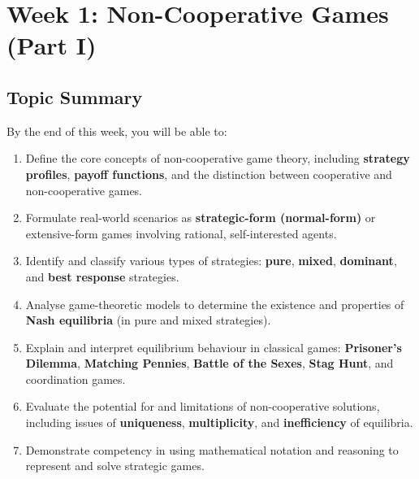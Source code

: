 \section{Week 1: Non-Cooperative Games (Part I)}

\subsection{Topic Summary}

\begin{keybox}
By the end of this week, you will be able to:
\begin{enumerate}
  \item Define the core concepts of non-cooperative game theory, including \textbf{strategy profiles}, \textbf{payoff functions}, and the distinction between cooperative and non-cooperative games.
  \item Formulate real-world scenarios as \textbf{strategic-form (normal-form)} or extensive-form games involving rational, self-interested agents.
  \item Identify and classify various types of strategies: \textbf{pure}, \textbf{mixed}, \textbf{dominant}, and \textbf{best response} strategies.
  \item Analyse game-theoretic models to determine the existence and properties of \textbf{Nash equilibria} (in pure and mixed strategies).
  \item Explain and interpret equilibrium behaviour in classical games: \textbf{Prisoner's Dilemma}, \textbf{Matching Pennies}, \textbf{Battle of the Sexes}, \textbf{Stag Hunt}, and coordination games.
  \item Evaluate the potential for and limitations of non-cooperative solutions, including issues of \textbf{uniqueness}, \textbf{multiplicity}, and \textbf{inefficiency} of equilibria.
  \item Demonstrate competency in using mathematical notation and reasoning to represent and solve strategic games.
\end{enumerate}
\end{keybox}

